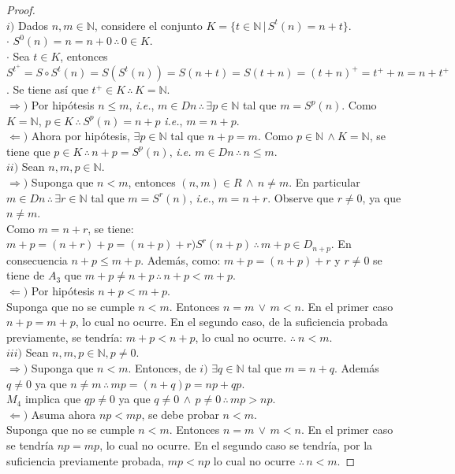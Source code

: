 \begin{proof} \\ 
     
    $i)$ Dados $n,m \in \mathbb{N}$, considere el conjunto $K=\{ t \in
    \mathbb{N} \, | \, S^t(n) = n+t\}$.\\
    $\cdot$ $S^0 (n) = n = n +0 \, \therefore \, 0 \in K$. \\
    $\cdot$ Sea $t \in K$, entonces $S^{t^+} = S \circ S^t(n) = S(S^t(n)) =
    S(n+t) = S(t +n) = (t + n)^+ = t^++ n = n + t^+$. Se tiene así que $t^+ \in
    K\, \therefore \, K = \mathbb{N}$.  \\
    $\Rightarrow )$ Por hipótesis $n \leq m$, \textit{i.e.},  $m \in Dn \,
    \therefore \, \exists p \in \mathbb{N}$ tal que $m = S^p (n)$. Como $K =
    \mathbb{N}$, $p \in K\, \therefore \, S^p(n) = n +p$ \textit{i.e.},
    $m=n+p$.\\
    $\Leftarrow )$ Ahora por hipótesis, $\exists p \in \mathbb{N}$ tal que $n +
    p = m$. Como $p \in \mathbb{N} \, \land K = \mathbb{N}$, se tiene que $p \in
    K\, \therefore \, n+p=S^p(n)$, \textit{i.e.} $m \in Dn \, \therefore  \, n
    \leq m$.\\

    $ii)$ Sean $n,m,p \in \mathbb{N}$. \\
    $\Rightarrow ) $ Suponga que  $n <m$, entonces $(n,m)\in R \, \land \, n
    \neq m$. En particular $m \in Dn\, \therefore \, \exists r \in \mathbb{N}$
    tal que $m = S^r(n)$, \textit{i.e.}, $m = n + r$. Observe que $r\neq 0$, ya
    que $ n \neq m$. \\
    Como $m = n + r$, se tiene: \\
    $m + p = (n + r)+p= (n+p)+r ) S^r(n +p)\, \therefore \, m + p \in D_{n+p}$.
    En consecuencia $n + p \leq m +p$. Además, como: $m +p = (n +p)+r$ y $r \neq
    0$ se tiene de $A_3$ que $m+p \neq n+p\, \therefore \, n+p < m+p$.\\
    $\Leftarrow )$ Por hipótesis $n+p < m+p$. \\
    Suponga que no se cumple $n <m$. Entonces $n=m \, \lor \, m<n$. En el primer
    caso $n + p =m + p$, lo cual no ocurre. En el segundo caso, de la
    suficiencia probada previamente, se tendría: $m + p < n + p$, lo cual no
    ocurre. $\therefore\ n < m$.\\

    $iii)$ Sean $n, m, p \in \mathbb{N}, p \neq 0$.\\
    $\Rightarrow )$ Suponga que $n <m$. Entonces, de $i)$ $\exists q \in
    \mathbb{N}$ tal que $m = n + q$. Además $q \neq 0$ ya que $n \neq m \,
    \therefore \, mp = (n +q)p = np + qp$.\\
    $M_4$ implica que $qp \neq 0$ ya que $q \neq 0 \, \land \,  p \neq 0 \,
    \therefore \, mp > np$. \\
    $\Leftarrow )$ Asuma ahora $np <mp$, se debe probar $n <m$. \\
    Suponga que no se cumple $n <m$. Entonces $n = m \, \lor \, m<n$. En el
    primer caso se tendría $np = mp$, lo cual no ocurre. En el segundo caso se
    tendría, por la suficiencia previamente probada, $mp < np$ lo cual no ocurre
    $\therefore\, n<m$.
\end{proof}
